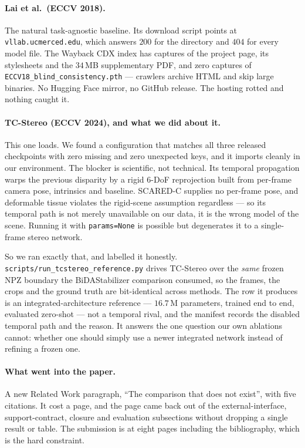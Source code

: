 \documentclass[11pt,a4paper]{article}
\begin{document}
\paragraph{Lai et al.\ (ECCV 2018).} The natural task-agnostic baseline. Its
download script points at \texttt{vllab.ucmerced.edu}, which answers $200$ for
the directory and $404$ for every model file. The Wayback CDX index has
captures of the project page, its stylesheets and the $34$\,MB supplementary
PDF, and zero captures of \texttt{ECCV18\_blind\_consistency.pth} --- crawlers
archive HTML and skip large binaries. No Hugging Face mirror, no GitHub
release. The hosting rotted and nothing caught it.

\paragraph{TC-Stereo (ECCV 2024), and what we did about it.} This one loads.
We found a configuration that matches all three released checkpoints with zero
missing and zero unexpected keys, and it imports cleanly in our environment.
The blocker is scientific, not technical. Its temporal propagation warps the
previous disparity by a rigid $6$-DoF reprojection built from per-frame camera
pose, intrinsics and baseline. SCARED-C supplies no per-frame pose, and
deformable tissue violates the rigid-scene assumption regardless --- so its
temporal path is not merely unavailable on our data, it is the wrong model of
the scene. Running it with \texttt{params=None} is possible but degenerates it
to a single-frame stereo network.

So we ran exactly that, and labelled it honestly.
\texttt{scripts/run\_tcstereo\_reference.py} drives TC-Stereo over the
\emph{same} frozen NPZ boundary the BiDAStabilizer comparison consumed, so the
frames, the crops and the ground truth are bit-identical across methods. The
row it produces is an integrated-architecture reference --- $16.7$\,M
parameters, trained end to end, evaluated zero-shot --- not a temporal rival,
and the manifest records the disabled temporal path and the reason. It answers
the one question our own ablations cannot: whether one should simply use a
newer integrated network instead of refining a frozen one.

\paragraph{What went into the paper.} A new Related Work paragraph, ``The
comparison that does not exist'', with five citations. It cost a page, and the
page came back out of the external-interface, support-contract, closure and
evaluation subsections without dropping a single result or table. The
submission is at eight pages including the bibliography, which is the hard
constraint.
\end{document}
